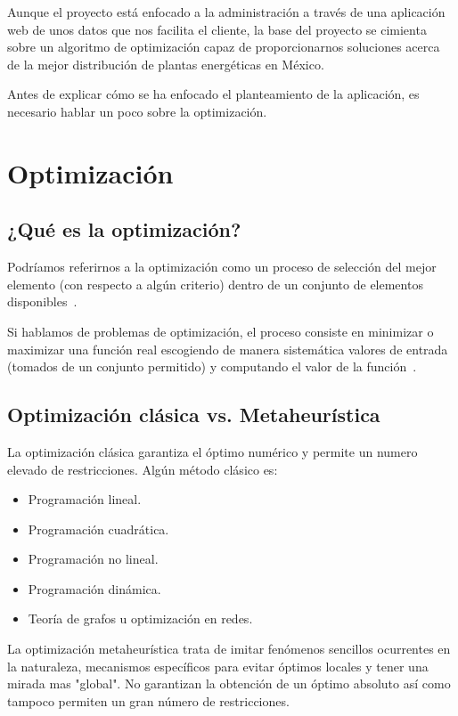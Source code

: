 
Aunque el proyecto está enfocado a la administración a través de una aplicación web de unos datos que nos facilita el cliente, la base del proyecto se cimienta sobre un algoritmo de optimización capaz de proporcionarnos soluciones acerca de la mejor distribución de plantas energéticas en México. 

Antes de explicar cómo se ha enfocado el planteamiento de la aplicación, es necesario hablar un poco sobre la optimización.

\section{Optimización}

\subsection{¿Qué es la optimización?}

Podríamos referirnos a la optimización como un proceso de selección del mejor elemento (con respecto a algún criterio) dentro de un conjunto de elementos disponibles~\cite{wiki:optimizacion}.

Si hablamos de problemas de optimización, el proceso consiste en minimizar o maximizar una función real escogiendo de manera sistemática valores de entrada (tomados de un conjunto permitido) y computando el valor de la función~\cite{wiki:optimizacion}.

\subsection{Optimización clásica vs. Metaheurística}

La optimización clásica garantiza el óptimo numérico y permite un numero elevado de restricciones. Algún método clásico es:
\begin{itemize}
	\item Programación lineal.
	\item Programación cuadrática.
	\item Programación no lineal.
	\item Programación dinámica.
	\item Teoría de grafos u optimización en redes.
\end{itemize}

La optimización metaheurística trata de imitar fenómenos sencillos ocurrentes en la naturaleza, mecanismos específicos para evitar óptimos locales y tener una mirada mas "global". No garantizan la obtención de un óptimo absoluto así como tampoco permiten un gran número de restricciones.

